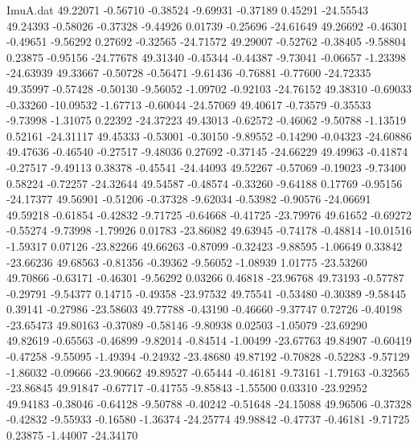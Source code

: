 \begin{filecontents}{ImuA.dat}
  49.22071   -0.56710   -0.38524   -9.69931   -0.37189    0.45291  -24.55543
  49.24393   -0.58026   -0.37328   -9.44926    0.01739   -0.25696  -24.61649
  49.26692   -0.46301   -0.49651   -9.56292    0.27692   -0.32565  -24.71572
  49.29007   -0.52762   -0.38405   -9.58804    0.23875   -0.95156  -24.77678
  49.31340   -0.45344   -0.44387   -9.73041   -0.06657   -1.23398  -24.63939
  49.33667   -0.50728   -0.56471   -9.61436   -0.76881   -0.77600  -24.72335
  49.35997   -0.57428   -0.50130   -9.56052   -1.09702   -0.92103  -24.76152
  49.38310   -0.69033   -0.33260  -10.09532   -1.67713   -0.60044  -24.57069
  49.40617   -0.73579   -0.35533   -9.73998   -1.31075    0.22392  -24.37223
  49.43013   -0.62572   -0.46062   -9.50788   -1.13519    0.52161  -24.31117
  49.45333   -0.53001   -0.30150   -9.89552   -0.14290   -0.04323  -24.60886
  49.47636   -0.46540   -0.27517   -9.48036    0.27692   -0.37145  -24.66229
  49.49963   -0.41874   -0.27517   -9.49113    0.38378   -0.45541  -24.44093
  49.52267   -0.57069   -0.19023   -9.73400    0.58224   -0.72257  -24.32644
  49.54587   -0.48574   -0.33260   -9.64188    0.17769   -0.95156  -24.17377
  49.56901   -0.51206   -0.37328   -9.62034   -0.53982   -0.90576  -24.06691
  49.59218   -0.61854   -0.42832   -9.71725   -0.64668   -0.41725  -23.79976
  49.61652   -0.69272   -0.55274   -9.73998   -1.79926    0.01783  -23.86082
  49.63945   -0.74178   -0.48814  -10.01516   -1.59317    0.07126  -23.82266
  49.66263   -0.87099   -0.32423   -9.88595   -1.06649    0.33842  -23.66236
  49.68563   -0.81356   -0.39362   -9.56052   -1.08939    1.01775  -23.53260
  49.70866   -0.63171   -0.46301   -9.56292    0.03266    0.46818  -23.96768
  49.73193   -0.57787   -0.29791   -9.54377    0.14715   -0.49358  -23.97532
  49.75541   -0.53480   -0.30389   -9.58445    0.39141   -0.27986  -23.58603
  49.77788   -0.43190   -0.46660   -9.37747    0.72726   -0.40198  -23.65473
  49.80163   -0.37089   -0.58146   -9.80938    0.02503   -1.05079  -23.69290
  49.82619   -0.65563   -0.46899   -9.82014   -0.84514   -1.00499  -23.67763
  49.84907   -0.60419   -0.47258   -9.55095   -1.49394   -0.24932  -23.48680
  49.87192   -0.70828   -0.52283   -9.57129   -1.86032   -0.09666  -23.90662
  49.89527   -0.65444   -0.46181   -9.73161   -1.79163   -0.32565  -23.86845
  49.91847   -0.67717   -0.41755   -9.85843   -1.55500    0.03310  -23.92952
  49.94183   -0.38046   -0.64128   -9.50788   -0.40242   -0.51648  -24.15088
  49.96506   -0.37328   -0.42832   -9.55933   -0.16580   -1.36374  -24.25774
  49.98842   -0.47737   -0.46181   -9.71725    0.23875   -1.44007  -24.34170

\end{filecontents}
